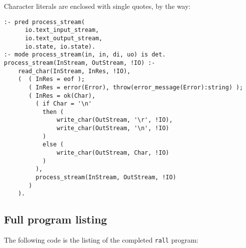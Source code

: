 Character literals are enclosed with single quotes, by the way:


\begin{lstlisting}[language=Mercury]
:- pred process_stream(
      io.text_input_stream,
      io.text_output_stream,
      io.state, io.state).
:- mode process_stream(in, in, di, uo) is det.
process_stream(InStream, OutStream, !IO) :-
    read_char(InStream, InRes, !IO),
    (  ( InRes = eof );
       ( InRes = error(Error), throw(error_message(Error):string) );
       ( InRes = ok(Char),
         ( if Char = '\n'
           then (
               write_char(OutStream, '\r', !IO),
               write_char(OutStream, '\n', !IO)
           )
           else (
               write_char(OutStream, Char, !IO)
           )
         ),
         process_stream(InStream, OutStream, !IO)
       )
    ).
  \end{lstlisting}
  
\subsection{Full program listing}
\label{sec:orgb1f820c}

The following code is the listing of the completed \texttt{rall} program:

